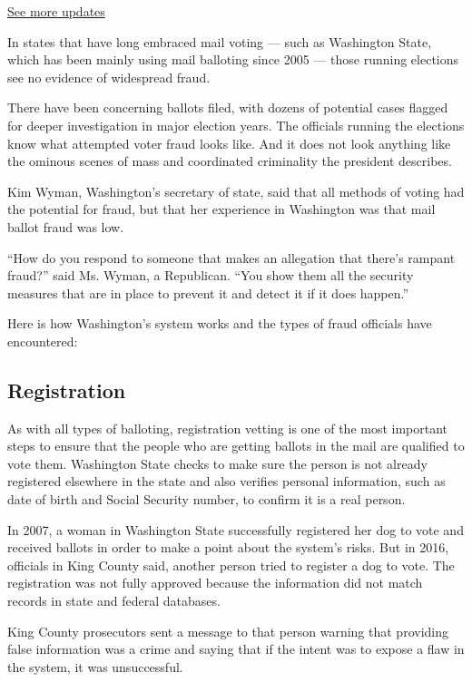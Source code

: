 \href{https://www.nytimes3xbfgragh.onion/2020/08/03/us/elections/biden-vs-trump.html?action=click\&pgtype=Article\&state=default\&region=MAIN_CONTENT_1\&context=storylines_live_updates}{See
more updates}

In states that have long embraced mail voting --- such as Washington
State, which has been mainly using mail balloting since 2005 --- those
running elections see no evidence of widespread fraud.

There have been concerning ballots filed, with dozens of potential cases
flagged for deeper investigation in major election years. The officials
running the elections know what attempted voter fraud looks like. And it
does not look anything like the ominous scenes of mass and coordinated
criminality the president describes.

Kim Wyman, Washington's secretary of state, said that all methods of
voting had the potential for fraud, but that her experience in
Washington was that mail ballot fraud was low.

``How do you respond to someone that makes an allegation that there's
rampant fraud?'' said Ms. Wyman, a Republican. ``You show them all the
security measures that are in place to prevent it and detect it if it
does happen.''

Here is how Washington's system works and the types of fraud officials
have encountered:

\hypertarget{registration}{%
\subsection{Registration}\label{registration}}

As with all types of balloting, registration vetting is one of the most
important steps to ensure that the people who are getting ballots in the
mail are qualified to vote them. Washington State checks to make sure
the person is not already registered elsewhere in the state and also
verifies personal information, such as date of birth and Social Security
number, to confirm it is a real person.

In 2007, a woman in Washington State successfully registered her dog to
vote and received ballots in order to make a point about the system's
risks. But in 2016, officials in King County said, another person tried
to register a dog to vote. The registration was not fully approved
because the information did not match records in state and federal
databases.

King County prosecutors sent a message to that person warning that
providing false information was a crime and saying that if the intent
was to expose a flaw in the system, it was unsuccessful.

